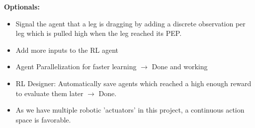 \cite{lillicrap2015continuous}





\textbf{Optionals:}

\begin{itemize}
	\item Signal the agent that a leg is dragging by adding a discrete observation per leg which is pulled high when the leg reached its PEP.
	
	\item Add more inputs to the RL agent
	
	\item Agent Parallelization for faster learning $\rightarrow$ Done and working
	
	\item RL Designer: Automatically save agents which reached a high enough reward to evaluate them later $\rightarrow$ Done.
	
	\item As we have multiple robotic 'actuators' in this project, a continuous action space is favorable.
	
\end{itemize}




